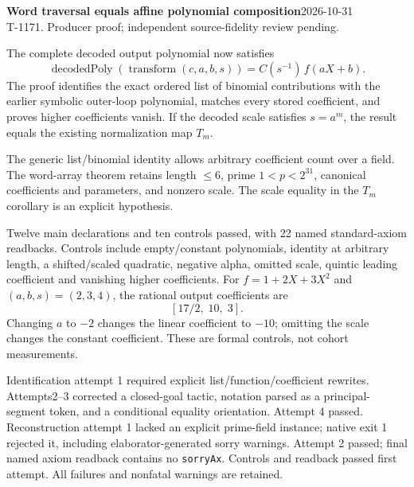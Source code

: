 \documentclass[10pt]{article}
\begin{document}
\textbf{Word traversal equals affine polynomial composition}\hfill2026-10-31\\T-1171. Producer proof; independent source-fidelity review pending.

The complete decoded output polynomial now satisfies
\[
 \operatorname{decodedPoly}(\operatorname{transform}(c,a,b,s))
   = C(s^{-1})\,f(aX+b).
\]
The proof identifies the exact ordered list of binomial contributions with the earlier symbolic outer-loop polynomial, matches every stored coefficient, and proves higher coefficients vanish. If the decoded scale satisfies $s=a^m$, the result equals the existing normalization map $T_m$.
\begin{center}\end{center}
The generic list/binomial identity allows arbitrary coefficient count over a field. The word-array theorem retains length $\le6$, prime $1<p<2^{31}$, canonical coefficients and parameters, and nonzero scale. The scale equality in the $T_m$ corollary is an explicit hypothesis.

Twelve main declarations and ten controls passed, with 22 named standard-axiom readbacks. Controls include empty/constant polynomials, identity at arbitrary length, a shifted/scaled quadratic, negative alpha, omitted scale, quintic leading coefficient and vanishing higher coefficients. For $f=1+2X+3X^2$ and $(a,b,s)=(2,3,4)$, the rational output coefficients are
\[
 [17/2,\;10,\;3].
\]
Changing $a$ to $-2$ changes the linear coefficient to $-10$; omitting the scale changes the constant coefficient. These are formal controls, not cohort measurements.

Identification attempt 1 required explicit list/function/coefficient rewrites. Attempts2--3 corrected a closed-goal tactic, notation parsed as a principal-segment token, and a conditional equality orientation. Attempt 4 passed. Reconstruction attempt 1 lacked an explicit prime-field instance; native exit 1 rejected it, including elaborator-generated sorry warnings. Attempt 2 passed; final named axiom readback contains no \texttt{sorryAx}. Controls and readback passed first attempt. All failures and nonfatal warnings are retained.
\end{document}
